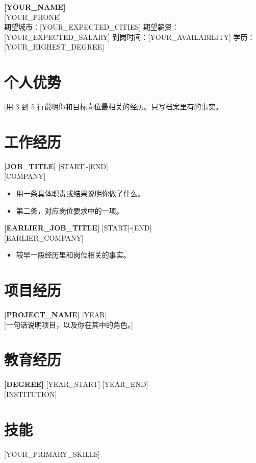 \documentclass[11pt,a4paper,fontset=fandol]{ctexart}
\begin{document}
{\LARGE\bfseries [YOUR\_NAME]}\\[2pt]
[YOUR\_PHONE] \\[2pt]
期望城市：[YOUR\_EXPECTED\_CITIES] \quad
期望薪资：[YOUR\_EXPECTED\_SALARY] \quad
到岗时间：[YOUR\_AVAILABILITY] \quad
学历：[YOUR\_HIGHEST\_DEGREE]

\section*{个人优势}
[用 3 到 5 行说明你和目标岗位最相关的经历。只写档案里有的事实。]

\section*{工作经历}
\textbf{[JOB\_TITLE]} \hfill [START]-[END]\\{}
[COMPANY] \quad [LOCATION]
\begin{itemize}
  \item 用一条具体职责或结果说明你做了什么。
  \item 第二条，对应岗位要求中的一项。
\end{itemize}

\textbf{[EARLIER\_JOB\_TITLE]} \hfill [START]-[END]\\{}
[EARLIER\_COMPANY] \quad [LOCATION]
\begin{itemize}
  \item 较早一段经历里和岗位相关的事实。
\end{itemize}

\section*{项目经历}
\textbf{[PROJECT\_NAME]} \hfill [YEAR]\\{}
[一句话说明项目，以及你在其中的角色。]

\section*{教育经历}
\textbf{[DEGREE]} \hfill [YEAR\_START]-[YEAR\_END]\\{}
[INSTITUTION] \quad [FIELD]

\section*{技能}
[YOUR\_PRIMARY\_SKILLS]
\end{document}
